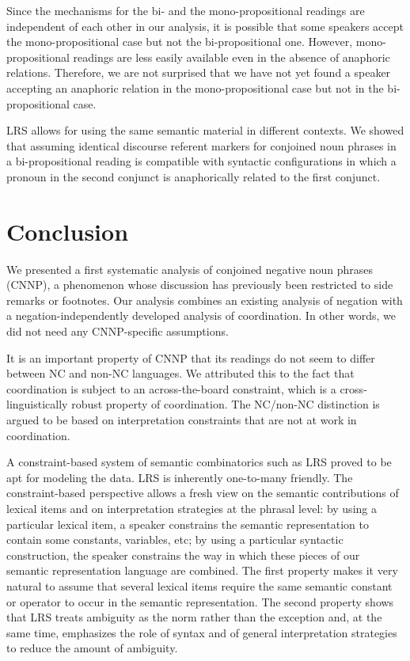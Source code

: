 \documentclass[output=paper]{langsci/langscibook}
\begin{document}
Since the mechanisms for the bi- and the mono-propositional readings are independent of each other in our analysis, it is possible that some speakers accept the mono-propositional case but not the bi-propositional one. 
However, mono-propositional readings are less easily available even in the absence of anaphoric relations. 
Therefore, we are not surprised that we have not yet found a speaker accepting an anaphoric relation in the mono-propositional case but not in the bi-propositional case.

LRS allows for using the same semantic material in different contexts. 
We showed that assuming identical discourse referent markers for conjoined noun phrases in a bi-propositional reading is compatible with syntactic configurations in which a pronoun in the second conjunct is anaphorically related to the first conjunct. 

\section{Conclusion}
\label{Sec-Conclusion}

\begin{sloppypar}
  We presented a first systematic analysis of conjoined negative noun
  phrases (CNNP), a phenomenon whose discussion has previously been
  restricted to side remarks or footnotes.  Our analysis combines an
  existing analysis of negation with a negation-independently
  developed analysis of coordination.  In other words, we did not need
  any CNNP-specific assumptions.
\end{sloppypar}
It is an important property of CNNP that its readings do not seem to differ between NC and non-NC languages.
We attributed this to the fact that coordination is subject to an across-the-board constraint, which is a cross-linguistically robust property of coordination. 
The NC/non-NC distinction is argued to be based on interpretation constraints that are not at work in coordination.


A constraint-based system of semantic combinatorics such as LRS proved to be apt for modeling the data. LRS is inherently one-to-many friendly. The constraint-based perspective allows a fresh view on the semantic contributions of lexical items and on interpretation strategies at the phrasal level: by using a particular lexical item, a speaker constrains the semantic representation to contain some constants, variables, etc; by using a particular syntactic construction, the speaker constrains the way in which these pieces of our semantic representation language are combined. 
The first property makes it very natural to assume that several lexical items require the same semantic constant or operator to occur in the semantic representation. 
The second property shows that LRS treats ambiguity as the norm rather than the exception and, at the same time, emphasizes the role of syntax and of general interpretation strategies to reduce the amount of ambiguity.
\end{document}
